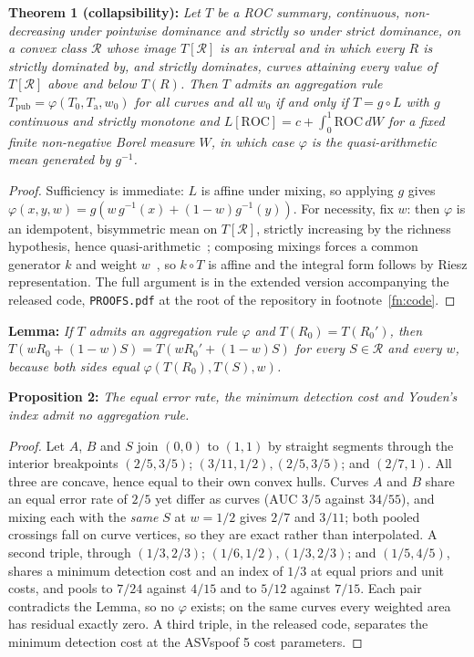\documentclass{article}
\begin{document}
\vspace{2pt}\noindent\textbf{Theorem 1 (collapsibility): } \emph{Let $T$ be a ROC summary,
continuous, non-decreasing under pointwise dominance and strictly so under strict dominance, on a convex class $\mathcal{R}$
whose image $T[\mathcal{R}]$ is an interval and in which every $R$ is strictly dominated by, and strictly dominates, curves attaining every value of $T[\mathcal{R}]$ above and below $T(R)$. Then $T$ admits an aggregation rule $T_{\mathrm{pub}} = \varphi(T_0,
T_{\mathrm{a}}, w_0)$ for all curves and all $w_0$ if and only if $T = g \circ L$ with $g$
continuous and strictly monotone and $L[\mathrm{ROC}] = c + \int_0^1 \mathrm{ROC}\,dW$ for a fixed
finite non-negative Borel measure $W$, in which case $\varphi$ is the quasi-arithmetic mean generated by $g^{-1}$.}

\begin{proof}
Sufficiency is immediate: $L$ is affine under mixing, so applying $g$ gives
$\varphi(x,y,w)=g(w\,g^{-1}(x)+(1-w)g^{-1}(y))$. For necessity, fix $w$: then $\varphi$ is an
idempotent, bisymmetric mean on $T[\mathcal{R}]$, strictly increasing by the richness hypothesis, hence
quasi-arithmetic~\cite[\S6.4]{aczel1966}; composing mixings forces a common generator $k$ and weight
$w$~\cite[Chs.~17--18]{aczel1989}, so $k\circ T$ is affine and the integral form follows by Riesz
representation. The full argument is in the extended version accompanying the released code, \texttt{PROOFS.pdf} at the root of the repository in footnote~\ref{fn:code}.
\end{proof}

\vspace{2pt}\noindent\textbf{Lemma: } \emph{If $T$ admits an aggregation rule $\varphi$ and
$T(R_0)=T(R_0')$, then $T(wR_0+(1-w)S)=T(wR_0'+(1-w)S)$ for every $S\in\mathcal{R}$ and every $w$,
because both sides equal $\varphi(T(R_0),T(S),w)$.}

\vspace{2pt}\noindent\textbf{Proposition 2: } \emph{The equal error rate, the minimum detection
cost and Youden's index admit no aggregation rule.}

\begin{proof}
Let $A$, $B$ and $S$ join $(0,0)$ to $(1,1)$ by straight segments through the interior breakpoints
$(2/5,3/5)$; $(3/11,1/2),(2/5,3/5)$; and $(2/7,1)$. All
three are concave, hence equal to their own convex hulls. Curves $A$ and $B$ share an equal error
rate of $2/5$ yet differ as curves ($\mathrm{AUC}$ $3/5$ against $34/55$), and
mixing each with the \emph{same} $S$ at $w=1/2$ gives $2/7$ and $3/11$; both
pooled crossings fall on curve vertices, so they are exact rather than interpolated. A second
triple, through $(1/3,2/3)$; $(1/6,1/2),(1/3,2/3)$; and
$(1/5,4/5)$, shares a minimum detection cost and an index of $1/3$ at equal priors
and unit costs, and pools to $7/24$ against $4/15$ and to $5/12$ against
$7/15$. Each pair contradicts the Lemma, so no $\varphi$ exists; on the same curves every
weighted area has residual exactly zero. A third triple, in the released code, separates the minimum detection cost at the ASVspoof 5 cost parameters.
\end{proof}
\end{document}
